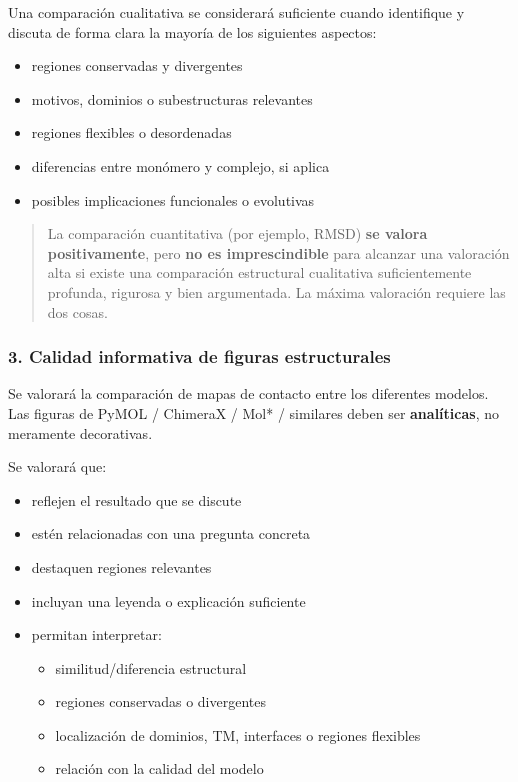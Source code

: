 \documentclass[
  11pt,
  a4paper,
  twoside]{scrreprt}
\providecommand{\tightlist}{%
  \setlength{\itemsep}{0pt}\setlength{\parskip}{0pt}}
\begin{document}
Una comparación cualitativa se considerará suficiente cuando identifique
y discuta de forma clara la mayoría de los siguientes aspectos:

\begin{itemize}
\item
  regiones conservadas y divergentes
\item
  motivos, dominios o subestructuras relevantes
\item
  regiones flexibles o desordenadas
\item
  diferencias entre monómero y complejo, si aplica
\item
  posibles implicaciones funcionales o evolutivas
\end{itemize}

\begin{quote}
La comparación cuantitativa (por ejemplo, RMSD) \textbf{se valora
positivamente}, pero \textbf{no es imprescindible} para alcanzar una
valoración alta si existe una comparación estructural cualitativa
suficientemente profunda, rigurosa y bien argumentada. La máxima
valoración requiere las dos cosas.
\end{quote}

\subsubsection{3. Calidad informativa de figuras
estructurales}\label{calidad-informativa-de-figuras-estructurales}

Se valorará la comparación de mapas de contacto entre los diferentes
modelos.\\
Las figuras de PyMOL / ChimeraX / Mol* / similares deben ser
\textbf{analíticas}, no meramente decorativas.

Se valorará que:

\begin{itemize}
\item
  reflejen el resultado que se discute
\item
  estén relacionadas con una pregunta concreta
\item
  destaquen regiones relevantes
\item
  incluyan una leyenda o explicación suficiente
\item
  permitan interpretar:

  \begin{itemize}
  \tightlist
  \item
    similitud/diferencia estructural
  \item
    regiones conservadas o divergentes
  \item
    localización de dominios, TM, interfaces o regiones flexibles
  \item
    relación con la calidad del modelo
  \end{itemize}
\end{itemize}
\end{document}
